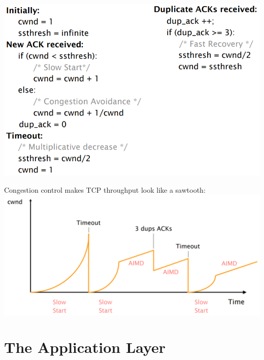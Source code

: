 \documentclass[a4paper, fontsize=8pt, landscape, DIV=1]{scrartcl}
\begin{document}
\begin{multicols*}{4}
\begin{center}
			\includegraphics[width=0.9\columnwidth]{images/Transport_Layer/congestion_code.png}
		\end{center}
		\vspace{0.1cm}
		Congestion control makes TCP throughput look like a sawtooth:\\
		
		\includegraphics[width=\columnwidth]{images/Transport_Layer/tcp_throughput.png}
		\par 
		
		\section{The Application Layer}

\end{multicols*}
\end{document}
